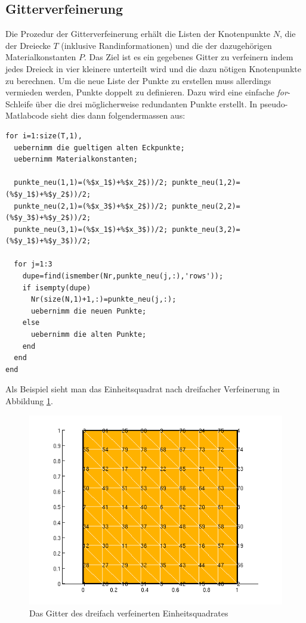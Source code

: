 \documentclass[ngerman,11pt,a4paper,titlepage]{article}
\begin{document}
\subsection{Gitterverfeinerung}
Die Prozedur der Gitterverfeinerung erhält die Listen der Knotenpunkte $N$, die der Dreiecke $T$ (inklusive Randinformationen) und die der dazugehörigen Materialkonstanten $P$. Das Ziel ist es ein gegebenes Gitter zu verfeinern indem jedes Dreieck in vier kleinere unterteilt wird und die dazu nötigen Knotenpunkte zu berechnen. Um die neue Liste der Punkte zu erstellen muss allerdings vermieden werden, Punkte doppelt zu definieren. Dazu wird eine einfache \emph{for}-Schleife über die drei möglicherweise redundanten Punkte erstellt. In pseudo-Matlabcode sieht dies dann folgendermassen aus:

\begin{lstlisting}
for i=1:size(T,1),
  uebernimm die gueltigen alten Eckpunkte;
  uebernimm Materialkonstanten;
  
  punkte_neu(1,1)=(%$x_1$)+%$x_2$))/2; punkte_neu(1,2)=(%$y_1$)+%$y_2$))/2;
  punkte_neu(2,1)=(%$x_3$)+%$x_2$))/2; punkte_neu(2,2)=(%$y_3$)+%$y_2$))/2;
  punkte_neu(3,1)=(%$x_1$)+%$x_3$))/2; punkte_neu(3,2)=(%$y_1$)+%$y_3$))/2;

  for j=1:3
    dupe=find(ismember(Nr,punkte_neu(j,:),'rows'));
    if isempty(dupe)
      Nr(size(N,1)+1,:)=punkte_neu(j,:);
      uebernimm die neuen Punkte;
    else
      uebernimm die alten Punkte;
    end
  end
end
\end{lstlisting}
Als Beispiel sieht man das Einheitsquadrat nach dreifacher Verfeinerung in Abbildung \ref{quad3}.
\begin{figure}[h]
  \begin{center}
    \includegraphics[scale=0.75]{pics/quad3.png}
  \end{center}
  \caption{Das Gitter des dreifach verfeinerten Einheitsquadrates}
  \label{quad3}
\end{figure}
\end{document}
